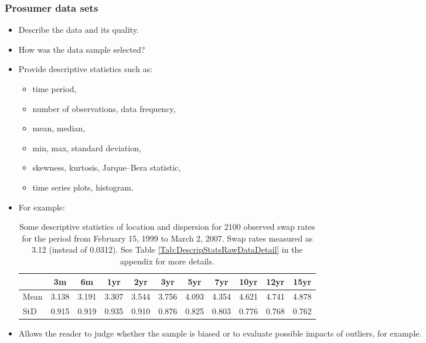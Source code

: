 \subsubsection{Prosumer data sets}

\begin{itemize}

    \item Describe the data and its quality.
    \item How was the data sample selected?
    \item Provide descriptive statistics such as:
        \begin{itemize}
            \item time period,
            \item number of observations, data frequency,
            \item mean, median,
            \item min, max, standard deviation,
            \item skewness, kurtosis, Jarque--Bera statistic,
            \item time series plots, histogram.
        \end{itemize}
    \item For example:
        \begin{table}[ht]

        \begin{center}
            {\footnotesize
            \begin{tabular}{l|cccccccccc}
                \hline \hline
                           & 3m    & 6m    & 1yr   & 2yr   & 3yr   & 5yr   & 7yr   & 10yr  & 12yr  & 15yr   \\
                \hline
                    Mean   & 3.138 & 3.191 & 3.307 & 3.544 & 3.756 & 4.093 & 4.354 & 4.621 & 4.741 & 4.878  \\
                    StD    & 0.915 & 0.919 & 0.935 & 0.910 & 0.876 & 0.825 & 0.803 & 0.776 & 0.768 & 0.762  \\
                \hline \hline
            \end{tabular}}
        \end{center}
        \caption{Some descriptive statistics of location and dispersion for
        2100 observed swap rates for the period from February 15, 1999
        to March 2, 2007. Swap rates measured as 3.12 (instead of 0.0312). See Table
        \ref{Tab:DescripStatsRawDataDetail} in the appendix for
        more details.}
        \label{Tab:DescripStatsRawData}
        \end{table}

    \item Allows the reader to judge whether the sample is biased or to evaluate possible impacts of outliers, for
    example.

\end{itemize}
